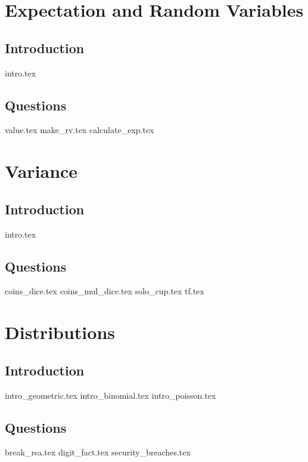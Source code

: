 \documentclass{exam}
\begin{document}
\section{Expectation and Random Variables}
\subsection{Introduction}
{intro.tex}
\subsection{Questions}
\begin{questions}
{value.tex}
{make_rv.tex}
{calculate_exp.tex}
\end{questions}

\section{Variance}
\subsection{Introduction}
{intro.tex}
\subsection{Questions}
\begin{questions}
{coins_dice.tex}
{coins_mul_dice.tex}
{solo_cup.tex}
{tf.tex}
\end{questions}

\section{Distributions}
\subsection{Introduction}
{intro_geometric.tex}
{intro_binomial.tex}
{intro_poisson.tex}
\subsection{Questions}
\begin{questions}
{break_rsa.tex}
{digit_fact.tex}
{security_breaches.tex}
\end{questions}
\end{document}
